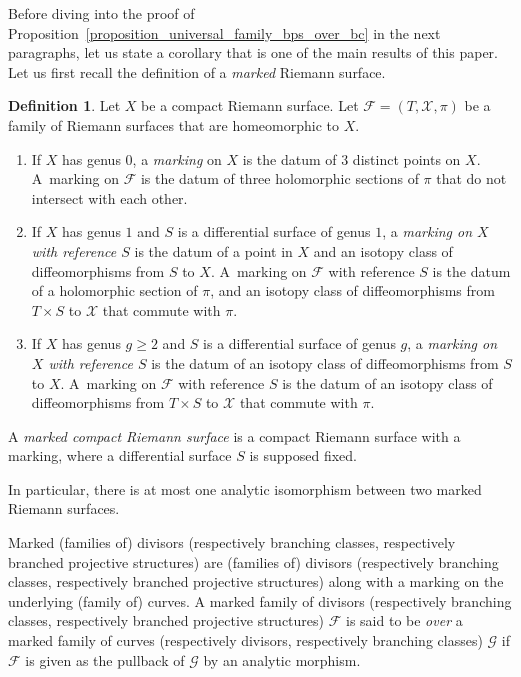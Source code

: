 \documentclass[JEP,XML,SOM,Unicode,NoEqCountersInSection,published]{cedram}
\theoremstyle{definition}
\newtheorem{definition}{Definition}[subsection]
\theoremstyle{plain}
\begin{document}
Before diving into the proof of Proposition~\ref{proposition_universal_family_bps_over_bc} in the next paragraphs, let us state a corollary that is one of the main results of this paper.
Let us first recall the definition of a \emph{marked} Riemann surface.

\begin{definition}
Let $X$ be a compact Riemann surface.
Let $\mathcal F = (T, \mathcal X, \pi)$ be a family of Riemann surfaces that are homeomorphic to $X$.
\begin{enumerate}
\item
If $X$ has genus $0$, a \emph{marking} on $X$ is the datum of $3$ distinct points on $X$.
A~marking on $\mathcal F$ is the datum of three holomorphic sections of $\pi$ that do not intersect with each other.
\item
If $X$ has genus $1$ and $S$ is a differential surface of genus $1$, a \emph{marking on $X$ with reference $S$} is the datum of a point in $X$ and an isotopy class of diffeomorphisms from $S$ to $X$.
A~marking on $\mathcal F$ with reference $S$ is the datum of a holomorphic section of $\pi$, and an isotopy class of diffeomorphisms from $T \times S$ to $\mathcal X$ that commute with $\pi$.
\item
If $X$ has genus $g \ge 2$ and $S$ is a differential surface of genus $g$, a \emph{marking on~$X$ with reference $S$} is the datum of an isotopy class of diffeomorphisms from $S$ to $X$.
A~marking on $\mathcal F$ with reference $S$ is the datum of an isotopy class of diffeomorphisms from $T \times S$ to $\mathcal X$ that commute with $\pi$.
\end{enumerate}

A \emph{marked compact Riemann surface} is a compact Riemann surface with a marking, where a differential surface $S$ is supposed fixed.
\end{definition}

In particular, there is at most one analytic isomorphism between two marked Riemann surfaces.

Marked (families of) divisors (respectively branching classes, respectively branched projective structures) are (families of) divisors (respectively branching classes, respectively branched projective structures) along with a marking on the underlying (family of) curves.
A marked family of divisors (respectively branching classes, respectively branched projective structures) $\mathcal F$ is said to be \emph{over} a marked family of curves (respectively divisors, respectively branching classes) $\mathcal G$ if $\mathcal F$ is given as the pullback of $\mathcal G$ by an analytic morphism.
\end{document}
